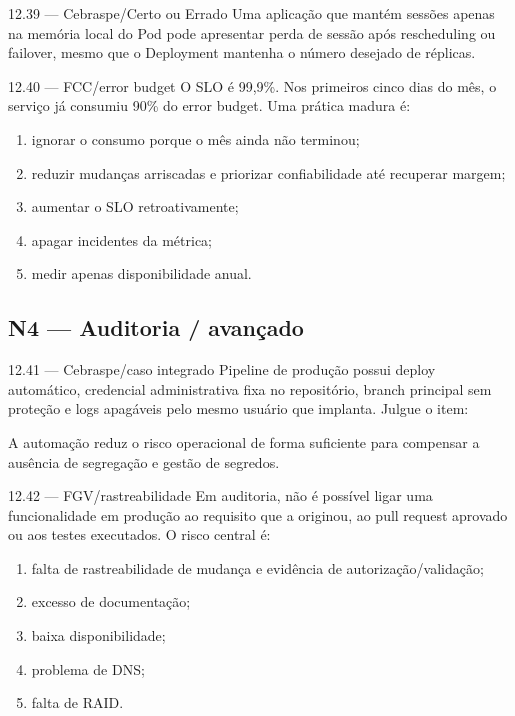 \begin{questao}{ 12.39 — Cebraspe/Certo ou Errado}
Uma aplicação que mantém sessões apenas na memória local do Pod pode apresentar perda de sessão após rescheduling ou failover, mesmo que o Deployment mantenha o número desejado de réplicas.
\end{questao}

\begin{questao}{ 12.40 — FCC/error budget}
O SLO é 99,9\%. Nos primeiros cinco dias do mês, o serviço já consumiu 90\% do error budget. Uma prática madura é:
\begin{enumerate}[label=\Alph*)]
\item ignorar o consumo porque o mês ainda não terminou;
\item reduzir mudanças arriscadas e priorizar confiabilidade até recuperar margem;
\item aumentar o SLO retroativamente;
\item apagar incidentes da métrica;
\item medir apenas disponibilidade anual.
\end{enumerate}
\end{questao}

\subsection*{N4 — Auditoria / avançado}

\begin{questao}{ 12.41 — Cebraspe/caso integrado}
Pipeline de produção possui deploy automático, credencial administrativa fixa no repositório, branch principal sem proteção e logs apagáveis pelo mesmo usuário que implanta. Julgue o item:

A automação reduz o risco operacional de forma suficiente para compensar a ausência de segregação e gestão de segredos.
\end{questao}

\begin{questao}{ 12.42 — FGV/rastreabilidade}
Em auditoria, não é possível ligar uma funcionalidade em produção ao requisito que a originou, ao pull request aprovado ou aos testes executados. O risco central é:
\begin{enumerate}[label=\Alph*)]
\item falta de rastreabilidade de mudança e evidência de autorização/validação;
\item excesso de documentação;
\item baixa disponibilidade;
\item problema de DNS;
\item falta de RAID.
\end{enumerate}
\end{questao}

